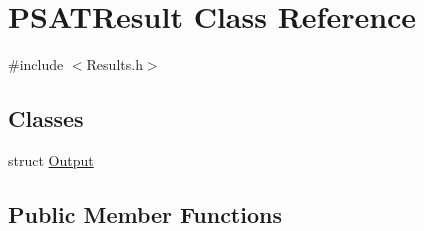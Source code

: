 \hypertarget{class_p_s_a_t_result}{}\section{P\+S\+A\+T\+Result Class Reference}
\label{class_p_s_a_t_result}


{\ttfamily \#include $<$Results.\+h$>$}

\subsection*{Classes}
\begin{DoxyCompactItemize}
\item 
struct \hyperlink{struct_p_s_a_t_result_1_1_output}{Output}
\end{DoxyCompactItemize}
\subsection*{Public Member Functions}
